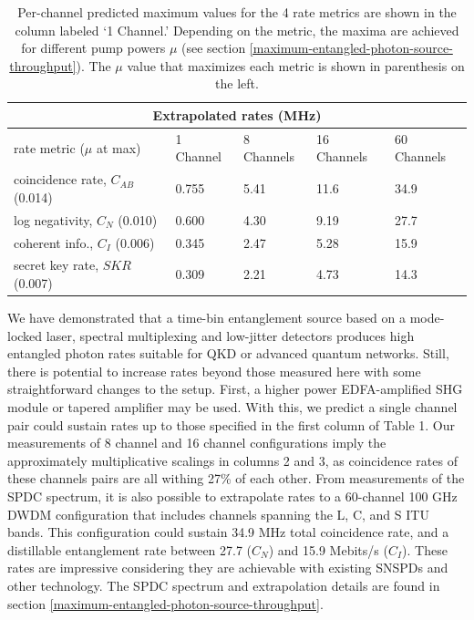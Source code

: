 \documentclass[11pt]{caltech_thesis} %
\begin{document}
\begin{table}
\begin{tabular}{ |p{3.5cm}||p{2.5cm}|p{2.5cm}|p{2.5cm}|p{2.5cm}|}
 \hline
 \multicolumn{5}{|c|}{Extrapolated rates (MHz)} \\
 \hline
 \makecell[l]{rate metric \\ ($\mu$ at max)}   &  1 Channel & 8 Channels & 16 Channels & 60 Channels \label{table:max_rates}\\
 \hline
 \makecell[l]{coincidence rate, $C_{AB}$ \\(0.014)} & 0.755 & 5.41    &  11.6  &  34.9     \\
 \hline
 \makecell[l]{log negativity, $C_N$ \\(0.010)}& 0.600 & 4.30    &  9.19  &  27.7   \\
 \hline
 \makecell[l]{coherent info., $C_I$ \\(0.006)}& 0.345 & 2.47 &  5.28  &  15.9 \\
 \hline
 \makecell[l]{secret key rate, $SKR$ \\(0.007)}& 0.309 & 2.21 &  4.73  &  14.3 \\
 \hline
\end{tabular}
\caption[{Extrapolating entanglement rates to more channels}]{Per-channel predicted maximum values for the 4 rate metrics are shown in the column labeled `1 Channel.' Depending on the metric, the maxima are achieved for different pump powers $\mu$ (see section \ref{maximum-entangled-photon-source-throughput}). The $\mu$ value that maximizes each metric is shown in parenthesis on the left.}
\label{table:maximum_rates}
\end{table}

We have demonstrated that a time-bin entanglement source based on a mode-locked laser, spectral multiplexing and low-jitter detectors produces high entangled photon rates suitable for QKD or advanced quantum networks. Still, there is potential to increase rates beyond those measured here with some straightforward changes to the setup. First, a higher power EDFA-amplified SHG module or tapered amplifier may be used. With this, we predict a single channel pair could sustain rates up to those specified in the first column of Table 1. Our measurements of 8 channel and 16 channel configurations imply the approximately multiplicative scalings in columns 2 and 3, as coincidence rates of these channels pairs are all withing 27\% of each other. From measurements of the SPDC spectrum, it is also possible to extrapolate rates to a 60-channel 100 GHz DWDM configuration that includes channels spanning the L, C, and S ITU bands. This configuration could sustain 34.9 MHz total coincidence rate, and a distillable entanglement rate between 27.7 ($C_N$) and 15.9 Mebits/s ($C_I$). These rates are impressive considering they are achievable with existing SNSPDs and other technology. The SPDC spectrum and extrapolation details are found in section \ref{maximum-entangled-photon-source-throughput}.
\end{document}
